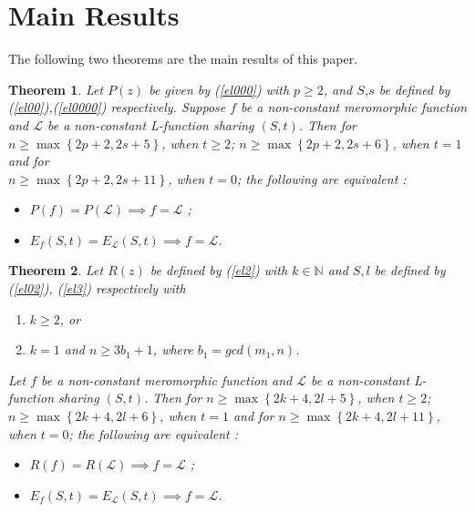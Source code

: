 \documentclass[a4paper,draft]{amsproc}
\theoremstyle{plain}
\newtheorem{theo}{Theorem}[section]
\theoremstyle{definition}
\theoremstyle{remark}
\numberwithin{equation}{section}
\begin{document}
\section{Main Results}   	
The following two theorems are the main results of this paper.
\begin{theo}\label{t1}
	Let $P(z)$ be given by (\ref{el000}) with $p\geq2$, and $S$,$s$ be defined by (\ref{el00}),(\ref{el0000}) respectively.
	Suppose $f$ be a non-constant meromorphic function and  $\mathcal{L}$
	be a non-constant L-function sharing $(S,t)$.
	Then for $n \geq \max \left\{2p+2,2s+5\right\}$, when $t\geq2$; $n \geq \max \left\{2p+2,2s+6\right\}$, when $t=1$ and for\\ $n \geq \max \left\{2p+2,2s+11\right\}$, when $t=0$; the following are equivalent :
	\begin{itemize}
		\item[(i)] $P(f)=P(\mathcal{L}) \implies f=\mathcal{L}$ ;
		\item[(ii)] $E_f(S, t)=E_\mathcal{L}(S,t)\implies f=\mathcal{L}$.
	\end{itemize}
\end{theo}
\begin{theo}\label{t2}
	Let $R(z)$ be defined by (\ref{el2}) with $k\in \mathbb{N}$ and $S, l$ be defined by (\ref{el02}), (\ref{el3}) respectively with \begin{enumerate}
		\item[(a)] $k\geq2$, or
		\item[(b)] $k=1$ and  $n\geq 3b_1+1$, where $b_1=gcd(m_1,n)$.
	\end{enumerate} 
	Let $f$ be a non-constant meromorphic function and  $\mathcal{L}$
	be a non-constant L-function sharing $(S,t)$.
	Then for $n \geq \max \left\{2k+4,2l+5\right\}$, when $t\geq2$;\\ $n \geq \max \left\{2k+4,2l+6\right\}$, when $t=1$ and for $n \geq \max \left\{2k+4,2l+11\right\}$, when $t=0$; the following are equivalent :
	\begin{itemize}
		\item[(i)] $R(f)=R(\mathcal{L}) \implies f=\mathcal{L}$ ;
		\item[(ii)] $E_f(S, t)=E_\mathcal{L}(S,t)\implies f=\mathcal{L}$.	\end{itemize}	
	
\end{theo} 
\end{document}
